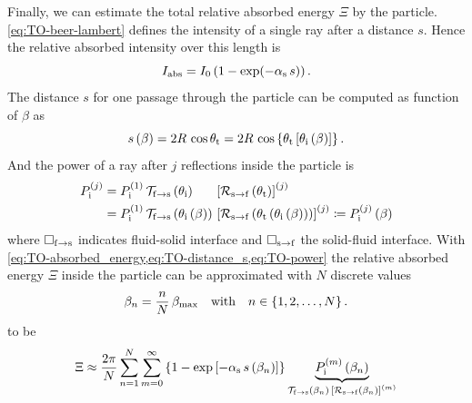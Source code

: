 Finally, we can estimate the total relative absorbed energy $\Xi$ by the 
particle. \cref{eq:TO-beer-lambert} defines the intensity of a single ray after 
a distance $s$. Hence the relative absorbed intensity over this length is
\begin{equation}
  I_{\mathrm{abs}} = I_{0} \left( 1 - \exp(-\alpha_{\mathrm{s}}\,s) 
  \right).
    \label{eq:TO-absorbed_energy}
\end{equation}
The distance $s$ for one passage through the particle can be computed as 
function of $\beta$ as
\begin{equation}
  s\left( \beta \right)
  =
  2R\,\cos\theta_{\mathrm{t}}
  =
  2R\,\cos\left\{ \theta_{\mathrm{t}}\left[ \theta_{\mathrm{i}}\left( \beta \right) \right] 
  \right\}.
    \label{eq:TO-distance_s}
\end{equation}
And the power of a ray after $j$ reflections inside the particle is
\begin{equation}
  \begin{alignedat}{3}
    P_{\mathrm{i}}^{(j)} &=
    P_{\mathrm{i}}^{(1)} \, &&
    \mathcal{T}_{\mathrm{f}\rightarrow\mathrm{s}}\left( \theta_{\mathrm{i}} \right) \, &&
    \left[\mathcal{R}_{\mathrm{s}\rightarrow\mathrm{f}}\left( \theta_{\mathrm{t}} 
    \right)\right]^{(j)}\\
    &=
    P_{\mathrm{i}}^{(1)} \, &&
    \mathcal{T}_{\mathrm{f}\rightarrow\mathrm{s}}
    \left( \theta_{\mathrm{i}}\left( \beta \right) \right) \, &&
    \left[
      \mathcal{R}_{\mathrm{s}\rightarrow\mathrm{f}}
      \left( \theta_{\mathrm{t}}\left( \theta_{\mathrm{i}}\left( \beta \right) \right) \right)
  \right]^{(j)} \coloneqq P_{\mathrm{i}}^{(j)}\left( \beta \right)
  \end{alignedat}
  \label{eq:TO-power}
\end{equation}
where $\Box_{\mathrm{f}\rightarrow\mathrm{s}}$ indicates fluid-solid interface and 
$\Box_{\mathrm{s}\rightarrow\mathrm{f}}$ the solid-fluid interface. With 
\cref{eq:TO-absorbed_energy,eq:TO-distance_s,eq:TO-power} the relative absorbed 
energy $\Xi$ inside the particle can be approximated with $N$ discrete values
\begin{equation}
  \beta_{n} = \frac{n}{N}\,\beta_{\mathrm{max}}\quad\text{with}\quad 
  n\in\left\{1,2,\ldots,N\right\}.
  \label{eq:TO-beta-disc}
\end{equation}
to be
\begin{equation}
    \Xi \approx
    \frac{2\pi}{N}
    \sum\limits_{n=1}^{N}
    \sum\limits_{m=0}^{\infty}
    \left\{ 1 - \exp\left[-\alpha_{\mathrm{s}}\,s\left( \beta_{n} \right) \right] 
    \right\}
    \underbrace{P_{\mathrm{i}}^{(m)}\left( \beta_{n} \right)}_{
    \mathcal{T}_{\mathrm{f}\rightarrow\mathrm{s}}\left( \beta_{n}\right) \,
    \left[\mathcal{R}_{\mathrm{s}\rightarrow\mathrm{f}}\left(\beta_{n}\right)\right]^{(m)}
}
  \label{eq:TO-total-absorbed}
\end{equation}
